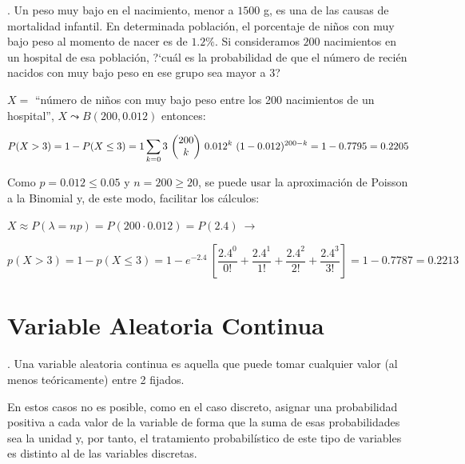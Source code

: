 \vspace{4mm}
\begin{example}
.	Un peso muy bajo en el nacimiento, menor a $1500$ g, es una de las causas de mortalidad infantil. En determinada población, el porcentaje de niños con muy bajo peso al momento de nacer es de $1.2\%$. Si consideramos $200$ nacimientos en un hospital de esa población, ?`cuál es la probabilidad de que el número de recién nacidos con muy bajo peso en ese grupo sea mayor a 3?

\vspace{2mm} $X =$ ``número de niños con muy bajo peso entre los 200 nacimientos de un hospital'', $X \leadsto B(200, 0.012)$ entonces:

\vspace{2mm} $P(X >3)=1-P(X \le 3)=1 \displaystyle \sum_{k=0}{3} \ \mqty(200\\k) \ 0.012^k \ (1-0.012)^{200-k} =1-0.7795=0.2205$

\vspace{2mm}  Como $p = 0.012 \le 0.05$ y $n=200 \ge  20$, se puede usar la aproximación de Poisson a la Binomial y, de este modo,  facilitar los cálculos:

\vspace{2mm} $X \approx P(\lambda=np) =P(200 \cdot 0.012)=P(2.4 ) \ \to \ $

\vspace{2mm} $p(X> 3)=1-p(X\le 3)=1-e^{-2.4}\ \left[ \dfrac{2.4^0}{0!}+\dfrac{2.4^1}{1!}+\dfrac{2.4^2}{2!}+\dfrac{2.4^3}{3!}  \right] =1-0.7787=0.2213$
	
\end{example}


\vspace{1cm}%
\section{Variable Aleatoria Continua}

\begin{definition}
.	Una variable aleatoria continua es aquella que puede tomar cualquier valor (al menos teóricamente) entre 2 fijados.
\end{definition}

En estos casos no es posible, como en el caso discreto, asignar una probabilidad positiva a cada valor de la variable de forma que la suma de esas probabilidades sea la unidad y, por tanto, el tratamiento probabilístico de este tipo de variables es distinto al de las variables discretas.


